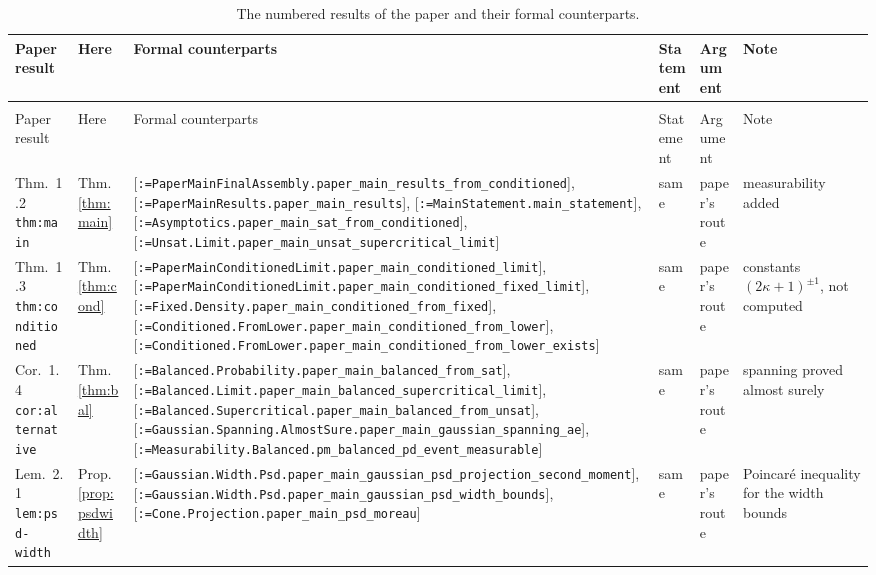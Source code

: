 \documentclass[11pt]{article}
\makeatletter
\newcommand{\formal@break}[1]{\@tfor\formal@tok:=#1\do{%
  \formal@tok
  \expandafter\ifx\formal@tok.\allowbreak\else
  \expandafter\ifx\formal@tok\_\allowbreak\fi\fi}}
\DeclareRobustCommand{\formal}[1]{\textnormal{[\texttt{\small\formal@break{#1}}]}}
\theoremstyle{plain}
\theoremstyle{definition}
\makeatother
\begin{document}
\begingroup\footnotesize\setlength{\tabcolsep}{3pt}\renewcommand{\arraystretch}{1.15}
\makeatletter\renewcommand{\formal}[1]{\textnormal{[\texttt{\formal@break{#1}}]}}\makeatother
\begin{longtable}{@{}>{\raggedright\arraybackslash}p{24mm}>{\raggedright\arraybackslash}p{18mm}>{\raggedright\arraybackslash}p{52mm}>{\raggedright\arraybackslash}p{13mm}>{\raggedright\arraybackslash}p{14mm}>{\raggedright\arraybackslash}p{27mm}@{}}
\caption{The numbered results of the paper and their formal counterparts.}\label{tab:corr}\\
\hline
Paper result & Here & Formal counterparts & Statement & Argument & Note\\
\hline
\endfirsthead
\multicolumn{6}{@{}l}{\small\emph{Table~\ref{tab:corr}, continued.}}\\
\hline
Paper result & Here & Formal counterparts & Statement & Argument & Note\\
\hline
\endhead
\hline
\endfoot
\hline
\endlastfoot
Thm.~1.2 \texttt{thm:\allowbreak{}main} & Thm.~\ref{thm:main} & \formal{PaperMainFinalAssembly.paper\_main\_results\_from\_conditioned}, \formal{PaperMainResults.paper\_main\_results}, \formal{MainStatement.main\_statement}, \formal{Asymptotics.paper\_main\_sat\_from\_conditioned}, \formal{Unsat.Limit.paper\_main\_unsat\_supercritical\_limit} & same & paper's route & measurability added\\
Thm.~1.3 \texttt{thm:\allowbreak{}conditioned} & Thm.~\ref{thm:cond} & \formal{PaperMainConditionedLimit.paper\_main\_conditioned\_limit}, \formal{PaperMainConditionedLimit.paper\_main\_conditioned\_fixed\_limit}, \formal{Fixed.Density.paper\_main\_conditioned\_from\_fixed}, \formal{Conditioned.FromLower.paper\_main\_conditioned\_from\_lower}, \formal{Conditioned.FromLower.paper\_main\_conditioned\_from\_lower\_exists} & same & paper's route & constants $(2\kappa+1)^{\pm1}$, not computed\\
Cor.~1.4 \texttt{cor:\allowbreak{}alternative} & Thm.~\ref{thm:bal} & \formal{Balanced.Probability.paper\_main\_balanced\_from\_sat}, \formal{Balanced.Limit.paper\_main\_balanced\_supercritical\_limit}, \formal{Balanced.Supercritical.paper\_main\_balanced\_from\_unsat}, \formal{Gaussian.Spanning.AlmostSure.paper\_main\_gaussian\_spanning\_ae}, \formal{Measurability.Balanced.pm\_balanced\_pd\_event\_measurable} & same & paper's route & spanning proved almost surely\\
Lem.~2.1 \texttt{lem:\allowbreak{}psd-\allowbreak{}width} & Prop.~\ref{prop:psdwidth} & \formal{Gaussian.Width.Psd.paper\_main\_gaussian\_psd\_projection\_second\_moment}, \formal{Gaussian.Width.Psd.paper\_main\_gaussian\_psd\_width\_bounds}, \formal{Cone.Projection.paper\_main\_psd\_moreau} & same & paper's route & Poincar\'e inequality for the width bounds\\

\end{longtable}
\end{document}

